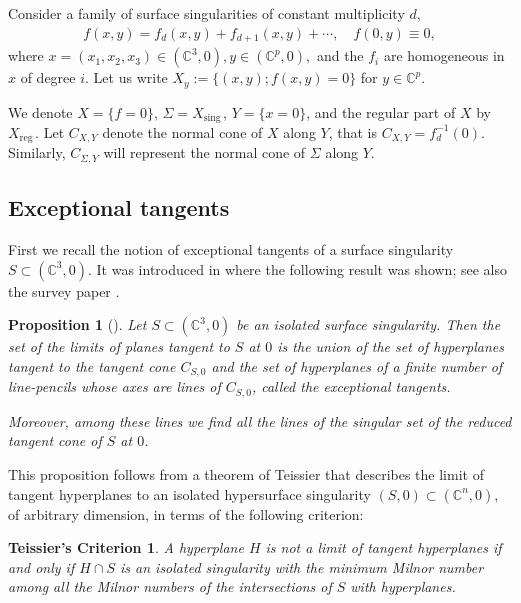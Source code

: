 \documentclass[12pt]{amsart}
\newtheorem{proposition}[theorem]{Proposition}
\newtheorem*{xTC}{Teissier's Criterion}
\theoremstyle{definition}
\numberwithin{equation}{section}
\newcommand{\C}{\mathbb{C}}
\DeclareMathOperator{\sing}{sing \, }
\DeclareMathOperator{\reg}{reg\,}
\begin{document}
Consider a family of surface singularities of constant multiplicity $d$, 
\begin{align*}
f(x,y)=f_d(x,y)+ f_{d+1}(x,y) +  \cdots  , \quad f(0,y)\equiv 0,
\end{align*}
 where $x=(x_1,x_2,x_3)\in(
\mathbb C^3,0), y\in (\C^p,0),$ and the $f_i$ are homogeneous in $x$ of degree $i$. 
 Let us write $X_y:=\{(x,y); f(x,y)=0\}$ for $y\in \C^p$. 

We denote $X=\{f=0\}, \, \Sigma=X_{\sing}$, $Y=\{x=0\}$, and the regular part of $X$ by $X_{\reg}$.
Let $C_{X,Y}$ denote the normal cone of $X$ along $Y$, that is  $C_{X,Y} = f_d^{-1} (0) $.  
Similarly,  $C_{\Sigma,Y}$  will represent the normal cone of $\Sigma$ along $Y$. 

\subsection{Exceptional tangents}
First we recall the notion of exceptional tangents of a surface singularity $S\subset (\C^3,0)$.  It was introduced in \cite{HL75} 
where the following result was shown; see also the survey paper \cite{LeSn21}.

\begin{proposition}[{\cite[Théorème 3.1]{HL75}}]\label{prop:HL}
Let $S\subset (\C^3,0)$ be an isolated surface singularity.  Then the set of the limits of planes tangent to $S$ at $0$ is the union of the set of hyperplanes tangent to the tangent cone $C_{S,0}$ and the set of hyperplanes of a finite number of line-pencils whose axes are lines of $C_{S,0}$, called the exceptional tangents. 

Moreover, among these lines we find all the lines of the singular set of the reduced tangent cone of $S$ at $0$.
\end{proposition}

This proposition follows from a theorem of Teissier \cite[Remarque 1.6]{Te73} that describes the limit of tangent hyperplanes to an isolated hypersurface singularity $(S,0)\subset (\C^n,0)$, of arbitrary dimension, in terms of the following criterion:  


\begin{xTC}
A hyperplane $H$ is not a limit of tangent hyperplanes if and only if  $H\cap S$ is an isolated singularity with  the minimum Milnor number among all the Milnor numbers of the intersections of $S$ with hyperplanes.
\end{xTC}
\end{document}
